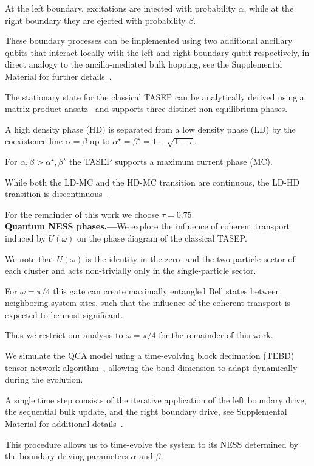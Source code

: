 \documentclass[aps,prl,twocolumn,groupedaddress,superscriptaddress,colorlinks,bookmarks=false,citecolor=darkspringgreen,linkcolor=darkolivegreen,urlcolor=navyblue]{revtex4-1}
\begin{document}
At the left boundary, excitations are injected with probability $\alpha$, while at the right boundary they are ejected with probability $\beta$.

These boundary processes can be implemented using two additional ancillary qubits that interact locally with the left and right boundary qubit respectively, in direct analogy to the ancilla-mediated bulk hopping, see the Supplemental Material for further details~\cite{SM}.


The stationary state for the classical TASEP can be analytically derived using a matrix product ansatz~\cite{Brank00,SM} and supports three distinct non-equilibrium phases.

A high density phase (HD) is separated from a low density phase (LD) by the coexistence line $\alpha = \beta$ up to $\alpha^\star = \beta^\star=1-\sqrt{1-\tau}$.

For $\alpha, \beta > \alpha^\star, \beta^\star$ the TASEP supports  a maximum current phase (MC).

While both the LD-MC and the HD-MC transition are continuous, the LD-HD transition is discontinuous~\cite{Brank00,SM}.

For the remainder of this work we choose $\tau = 0.75$.\\


{\bf Quantum NESS phases.---}We explore the influence of coherent transport induced by $U(\omega)$ on the phase diagram of the classical TASEP.

We note that $U(\omega)$ is the identity in the zero- and the two-particle sector of each cluster and acts non-trivially only in the single-particle sector.

For $\omega = \pi/4$ this gate can create maximally entangled Bell states between neighboring system sites, such that the influence of the coherent transport is expected to be most significant.

Thus we restrict our analysis to $\omega=\pi/4$ for the remainder of this work.


We simulate the QCA model using a time-evolving block decimation (TEBD) tensor-network algorithm~\cite{Vidal04,Vidal07}, allowing the bond dimension to adapt dynamically during the evolution.

A single time step consists of the iterative application of the left boundary drive, the sequential bulk update,
and the right boundary drive, see Supplemental Material for additional details~\cite{SM}.

This procedure allows us to time-evolve the system to its NESS determined by the boundary driving parameters $\alpha$ and $\beta$.
\end{document}
